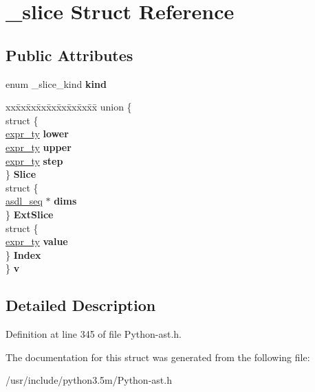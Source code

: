 \hypertarget{struct__slice}{}\section{\+\_\+slice Struct Reference}
\label{struct__slice}
\subsection*{Public Attributes}
\begin{DoxyCompactItemize}
\item 
enum \+\_\+slice\+\_\+kind {\bfseries kind}\hypertarget{struct__slice_a9db6ac61022be11837644803e62dbae3}{}\label{struct__slice_a9db6ac61022be11837644803e62dbae3}

\item 
\begin{tabbing}
xx\=xx\=xx\=xx\=xx\=xx\=xx\=xx\=xx\=\kill
union \{\\
\>struct \{\\
\>\>\hyperlink{struct__expr}{expr\_ty} {\bfseries lower}\\
\>\>\hyperlink{struct__expr}{expr\_ty} {\bfseries upper}\\
\>\>\hyperlink{struct__expr}{expr\_ty} {\bfseries step}\\
\>\} {\bfseries Slice}\\
\>struct \{\\
\>\>\hyperlink{structasdl__seq}{asdl\_seq} $\ast$ {\bfseries dims}\\
\>\} {\bfseries ExtSlice}\\
\>struct \{\\
\>\>\hyperlink{struct__expr}{expr\_ty} {\bfseries value}\\
\>\} {\bfseries Index}\\
\} {\bfseries v}\hypertarget{struct__slice_a9e52fcacb845ab54d494bb452a08500f}{}\label{struct__slice_a9e52fcacb845ab54d494bb452a08500f}
\\

\end{tabbing}\end{DoxyCompactItemize}


\subsection{Detailed Description}


Definition at line 345 of file Python-\/ast.\+h.



The documentation for this struct was generated from the following file\+:\begin{DoxyCompactItemize}
\item 
/usr/include/python3.\+5m/Python-\/ast.\+h\end{DoxyCompactItemize}
